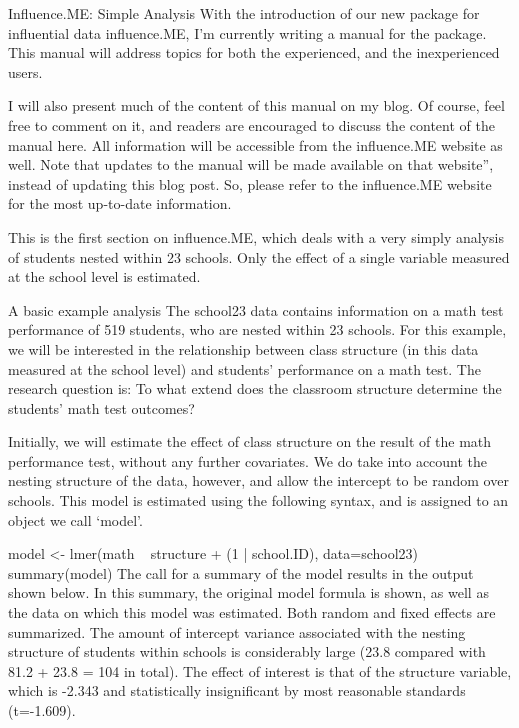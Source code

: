 Influence.ME: Simple Analysis
With the introduction of our new package for influential data influence.ME, I’m currently writing a manual for the package. This manual will address topics for both the experienced, and the inexperienced users.

I will also present much of the content of this manual on my blog. Of course, feel free to comment on it, and readers are encouraged to discuss the content of the manual here. All information will be accessible from the influence.ME website as well. Note that updates to the manual will be made available on that website”, instead of updating this blog post. So, please refer to the influence.ME website for the most up-to-date information.

This is the first section on influence.ME, which deals with a very simply analysis of students nested within 23 schools. Only the effect of a single variable measured at the school level is estimated.


A basic example analysis
The school23 data contains information on a math test performance of 519 students, who are nested within 23 schools. For this example, we will be interested in the relationship between class structure (in this data measured at the school level) and students’ performance on a math test. The research question is: To what extend does the classroom structure determine the students’ math test outcomes?

Initially, we will estimate the effect of class structure on the result of the math performance test, without any further covariates. We do take into account the nesting structure of the data, however, and allow the intercept to be random over schools. This model is estimated using the following syntax, and is assigned to an object we call ‘model’.

model <- lmer(math ~  structure + (1 | school.ID), data=school23)
summary(model)
The call for a summary of the model results in the output shown below. In this summary, the original model formula is shown, as well as the data on which this model was estimated. Both random and fixed effects are summarized. The amount of intercept variance associated with the nesting structure of students within schools is considerably large (23.8 compared with 81.2 + 23.8 = 104 in total). The effect of interest is that of the structure variable, which is -2.343 and statistically insignificant by most reasonable standards (t=-1.609).

